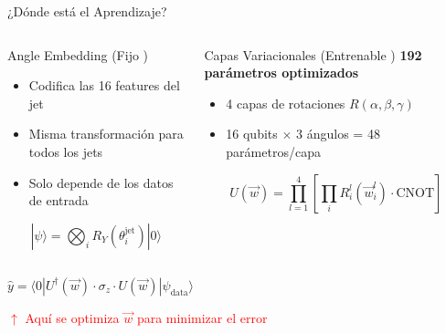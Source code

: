 \documentclass[aspectratio=169]{beamer}
\begin{document}
\begin{frame}{¿Dónde está el Aprendizaje?}
  \begin{columns}
    \begin{column}{0.49\textwidth}
      \begin{block}{Angle Embedding (Fijo )}
        \begin{itemize}
          \item Codifica las 16 features del jet
          \item Misma transformación para todos los jets
          \item Solo depende de los datos de entrada
        \end{itemize}
        $$|\psi\rangle = \bigotimes_i R_Y(\theta_i^{\text{jet}})|0\rangle$$
      \end{block}
    \end{column}
    
    \begin{column}{0.49\textwidth}
      \begin{alertblock}{Capas Variacionales (Entrenable )}
        \textbf{192 parámetros optimizados}
        \begin{itemize}
          \item 4 capas de rotaciones $R(\alpha, \beta, \gamma)$
          \item 16 qubits $\times$ 3 ángulos = 48 parámetros/capa
        \end{itemize}
        $$U(\vec{w}) = \prod_{l=1}^{4} \left[\prod_i R_i^l(\vec{w}_i^l) \cdot \text{CNOT}\right]$$
      \end{alertblock}
    \end{column}
  \end{columns}
  
  \vspace{1em}
  \begin{center}
    \Large
    $\hat{y} = \langle 0 | U^\dagger(\vec{w}) \cdot \sigma_z \cdot U(\vec{w}) | \psi_{\text{data}} \rangle$
    
    \textcolor{red}{$\uparrow$ Aquí se optimiza $\vec{w}$ para minimizar el error}
  \end{center}
\end{frame}
\end{document}
